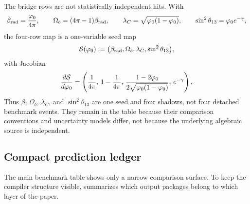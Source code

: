 \begin{remark}
The bridge rows are not statistically independent hits. With
\[
\beta_{\mathrm{rad}}=\frac{\varphi_0}{4\pi},
\qquad
\Omega_b=(4\pi-1)\beta_{\mathrm{rad}},
\qquad
\lambda_C=\sqrt{\varphi_0(1-\varphi_0)},
\qquad
\sin^2\theta_{13}=\varphi_0 e^{-\gamma},
\]
the four-row map is a one-variable seed map
\[
\mathcal S(\varphi_0):=\bigl(\beta_{\mathrm{rad}},\Omega_b,\lambda_C,\sin^2\theta_{13}\bigr),
\]
with Jacobian
\[
\frac{d\mathcal S}{d\varphi_0}
=
\left(
\frac{1}{4\pi},
\,
1-\frac{1}{4\pi},
\,
\frac{1-2\varphi_0}{2\sqrt{\varphi_0(1-\varphi_0)}},
\,
e^{-\gamma}
\right).
\]
Thus $\beta$, $\Omega_b$, $\lambda_C$, and $\sin^2\theta_{13}$ are one seed and four shadows, not four detached benchmark events. They remain in the table because their comparison conventions and uncertainty models differ, not because the underlying algebraic source is independent.
\end{remark}

\subsection{Compact prediction ledger}

The main benchmark table shows only a narrow comparison surface. To keep the compiler structure visible,  summarizes which output packages belong to which layer of the paper.

